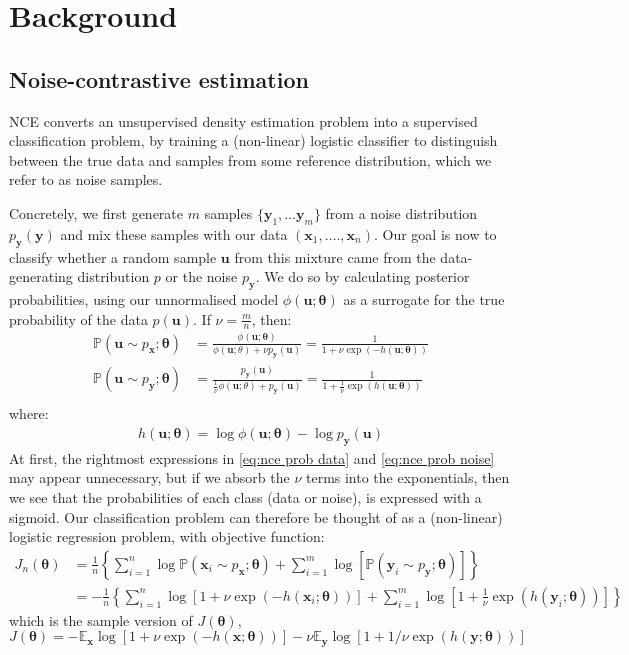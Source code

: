\documentclass[11pt, oneside]{article}
\newcommand{\thetab}{{\boldsymbol{\theta}}}
\newcommand{\pnn}{\phi}
\newcommand{\pdata}{p_{ \mathbf x}}
\newcommand{\pnoise}{p_{ \mathbf y}}
\renewcommand{\u}{{\mathbf u}}
\newcommand{\x}{{\mathbf x}}
\newcommand{\y}{{\mathbf y}}
\renewcommand{\P}{\mathbb{P}}
\newcommand{\E}{\mathbb{E}}
\newcommand{\Ex}{\E_{\x}}
\newcommand{\Ey}{\E_{\y}}
\begin{document}
\section{Background}
\subsection{Noise-contrastive estimation}
\label{sec:nce}
NCE converts an unsupervised density estimation problem into a supervised classification problem, by training a (non-linear) logistic classifier to distinguish between the true data and samples from some reference distribution, which we refer to as noise samples.

Concretely, we first generate $m$ samples $\{\textbf{y}_1, \ldots \textbf{y}_m\}$ from a noise distribution $\pnoise(\textbf{y})$ and mix these samples with our data $(\textbf{x}_1, …., \textbf{x}_n)$. Our goal is now to classify whether a random sample $\u$ from this mixture came from the data-generating distribution $p$ or the noise $\pnoise$. We do so by calculating posterior probabilities, using our unnormalised model $\phi(\u; \thetab)$ as a surrogate for the true probability of the data $p(\u)$. If $\nu = \frac{m}{n}$, then:
\begin{align}
    \P( \u \sim \pdata; \thetab ) &= \frac{\pnn(\textbf{u}; \thetab)}{\pnn(\textbf{u}; \theta) + \nu \pnoise(\textbf{u})} = 
    \frac{1}{1 + \nu \exp \left( -h(\u;\thetab) \right)} \label{eq:nce prob data}\\
    \P( \u \sim \pnoise; \thetab ) &= \frac{\pnoise(\textbf{u})}{\frac{1}{\nu}\pnn(\textbf{u}; \theta) + \pnoise(\textbf{u})} = 
    \frac{1}{1 + \frac{1}{\nu} \exp \left( h(\u;\thetab) \right)} \label{eq:nce prob noise} \\
\end{align}
where:
\begin{align}
    h(\u;\thetab) = \log \pnn(\u ; \thetab) - \log \pnoise(\textbf{u})
\end{align}
At first, the rightmost expressions in \ref{eq:nce prob data} and \ref{eq:nce prob noise} may appear unnecessary, but if we absorb the $\nu$ terms into the exponentials, then we see that the probabilities of each class (data or noise), is expressed with a sigmoid. Our classification problem can therefore be thought of as a (non-linear) logistic regression problem, with objective function:
\begin{align}
  J_n(\thetab)&= \frac{1}{n} \left\{\sum_{i=1}^{n} \log  \P( \x_i \sim \pdata; \thetab ) + \sum_{i=1}^{m} \log\left[\P( \y_i \sim \pnoise; \thetab )\right]\right\}\\
  & = -\frac{1}{n} \left\{\sum_{i=1}^{n} \log \left[1+\nu \exp(-h(\x_i;\thetab))\right] + \sum_{i=1}^{m} \log \left[1+ \frac{1}{\nu} \exp(h(\y_i;\thetab))\right]\right\}
  \label{eq:Jn}
\end{align}
which is the sample version of $J(\thetab)$,
\begin{equation}
  J(\thetab) = - \Ex  \log \left[1+\nu \exp(-h(\x;\thetab))\right] - \nu \Ey \log \left[1+1/\nu \exp(h(\y;\thetab))\right]
  \label{eq:J}
\end{equation}
\end{document}
